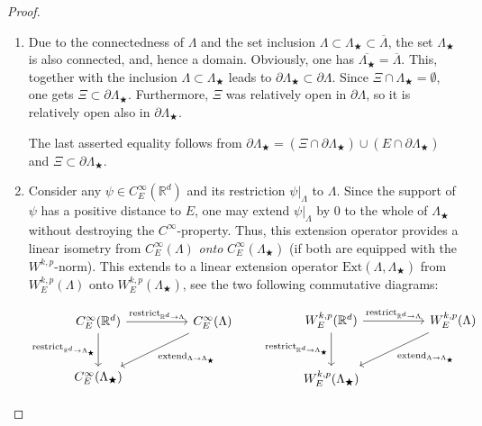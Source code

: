 \documentclass[10pt,leqno]{amsart}
\theoremstyle{definition}
\numberwithin{equation}{section}
\begin{document}
\begin{proof}
\begin{enumerate}
  \item Due to the connectedness of $\Lambda$ and the set inclusion
$\Lambda
\subset
	\Lambda_\bigstar \subset \overline \Lambda$, the set $\Lambda_\bigstar$
is
	also connected, and, hence a domain. Obviously, one has
	$\overline{\Lambda_\bigstar} = \overline \Lambda$. This, together with
the
	inclusion $\Lambda \subset \Lambda_\bigstar$ leads to
	$\partial \Lambda_\bigstar \subset \partial \Lambda$. Since $\Xi \cap
	\Lambda_\bigstar = \emptyset$, one gets $\Xi \subset
	\partial \Lambda_\bigstar$. Furthermore, $\Xi$ was relatively open in
	$\partial \Lambda$, so it is relatively open also in $\partial
	\Lambda_\bigstar$.

	The last asserted equality follows from $\partial \Lambda_\bigstar = (
	\Xi \cap \partial \Lambda_\bigstar) \cup (E \cap
	\partial \Lambda_\bigstar)$ and $\Xi \subset \partial \Lambda_\bigstar$.
  \item Consider any $\psi \in C^\infty_E({{\mathbb R}}^d)$ and its restriction
	$\psi|_\Lambda$ to $\Lambda$. Since the support of $\psi$ has a positive
	distance to $E$, one may extend $\psi|_\Lambda$ by $0$ to the whole of
	$\Lambda_\bigstar$ without destroying the $C^\infty$-property.
        Thus, this extension operator
	provides a linear isometry from $C^\infty_E(\Lambda)$ \emph{onto}
	$C^\infty_E(\Lambda_\bigstar)$ (if both are equipped with the 
	$W^{k,p}$-norm). This extends to a linear extension operator
	$\mathrm{Ext}(\Lambda,\Lambda_\bigstar)$ from $W^{k,p}_E(\Lambda)$ onto
	$W^{k,p}_E(\Lambda_\bigstar)$, see the two following commutative
	diagrams:

\begin{minipage}{0.85\textwidth}
\begin{equation*}
\begin{tikzcd}[row sep=large, column sep=huge]
C^{\infty}_E (\mathbb{R}^d)
\arrow{d}[swap]{\operatorname*{restrict}_{\mathbb{R}^d\to\Lambda_\bigstar}}
\arrow{r}{\operatorname*{restrict}_{\mathbb{R}^d\to\Lambda}} 
& 
C^{\infty}_E(\Lambda) 
\arrow{ld}{\operatorname*{extend}_{\Lambda\to {\Lambda_\bigstar}}}
\\
C^{\infty}_E ({\Lambda_\bigstar})
\end{tikzcd}
\qquad
\begin{tikzcd}[row sep=large, column sep=huge]
	W^{k,p}_E (\mathbb{R}^d)
 	\arrow{r}{\operatorname*{restrict}_{\mathbb{R}^d\to\Lambda}}
\arrow{d}[swap]{\operatorname*{restrict}_{\mathbb{R}^d\to{\Lambda_\bigstar}}}
 	& W^{k,p}_E (\Lambda)
 	\arrow{ld}{\operatorname*{extend}_{\Lambda\to {\Lambda_\bigstar}}}
 	\\  
 	W^{k,p}_E ({\Lambda_\bigstar})
 \end{tikzcd}
\end{equation*}
\end{minipage}
\end{enumerate}
\end{proof}
 
\end{document}
